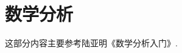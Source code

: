 \newpage
\inmainbodyfalse
\part{数学分析}
这部分内容主要参考陆亚明《数学分析入门》\cite{陆亚明2023数学分析入门}.



\inmainbodytrue













